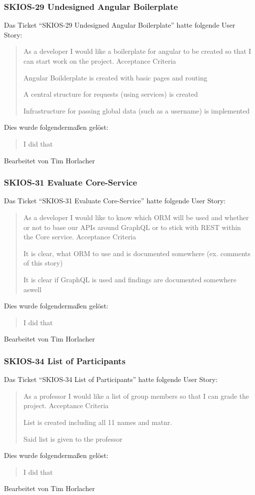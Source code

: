 \subsubsection{SKIOS-29 Undesigned Angular Boilerplate}
Das Ticket \enquote{SKIOS-29 Undesigned Angular Boilerplate} hatte folgende User Story:
\begin{quotation}
    As a developer I would like a boilerplate for angular to be created so that I can start work on the project.
Acceptance Criteria

    Angular Boilderplate is created with basic pages and routing

    A central structure for requests (using services) is created

    Infrastructure for passing global data (such as a username) is implemented
\end{quotation}
Dies wurde folgendermaßen gelöst:
\begin{quotation}
    I did that
    
\end{quotation}
Bearbeitet von Tim Horlacher

\subsubsection{SKIOS-31 Evaluate Core-Service}
Das Ticket \enquote{SKIOS-31 Evaluate Core-Service} hatte folgende User Story:
\begin{quotation}
    As a developer I would like to know which ORM will be used and whether or not to base our APIs around GraphQL or to stick with REST within the Core service.
Acceptance Criteria

    It is clear, what ORM to use and is documented somewhere (ex. comments of this story)

    It is clear if GraphQL is used and findings are documented somewhere aswell
\end{quotation}
Dies wurde folgendermaßen gelöst:
\begin{quotation}
    I did that
\end{quotation}
Bearbeitet von Tim Horlacher

\subsubsection{SKIOS-34 List of Participants}
Das Ticket \enquote{SKIOS-34 List of Participants} hatte folgende User Story:
\begin{quotation}
    As a professor I would like a list of group members so that I can grade the project.
Acceptance Criteria

    List is created including all 11 names and matnr.

    Said list is given to the professor
\end{quotation}
Dies wurde folgendermaßen gelöst:
\begin{quotation}
    I did that
\end{quotation}
Bearbeitet von Tim Horlacher

